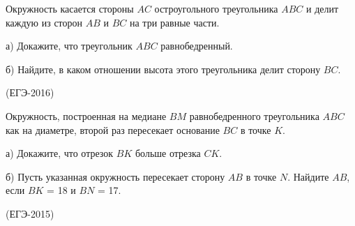 \documentclass[c,12pt]{beamer}  %
\begin{document}
	\begin{frame}
		\begin{block}{}
			Окружность касается стороны $AC$ остроугольного треугольника
		 $ABC$ и делит каждую из сторон $AB$ и $BC$ на три равные части.
			
			а) Докажите, что треугольник $ABC$ равнобедренный.
			
			б) Найдите, в каком отношении высота этого треугольника делит
			сторону $BC$.
			
			(ЕГЭ-2016)
		\end{block}
	\end{frame}

	\begin{frame}
		\begin{block}{}
			Окружность, построенная на медиане $BM$ равнобедренного
			треугольника $ABC$ как на диаметре, второй раз пересекает
			основание $BC$ в точке $K$.
			
			а) Докажите, что отрезок $BK$ больше отрезка $CK$.
			
			б) Пусть указанная окружность пересекает сторону $AB$ в точке
		 $N$. Найдите $AB$, если $BK$ = 18 и $BN$ = 17.
			
			(ЕГЭ-2015)
		\end{block}
	\end{frame}
\end{document}
